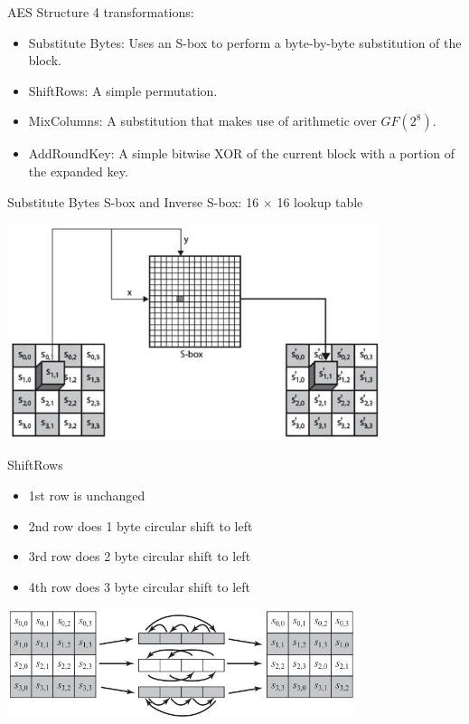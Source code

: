 \documentclass{beamer}
\begin{document}
\begin{frame}{AES Structure}
	4 transformations:
	\begin{itemize}
		\item Substitute Bytes:
		      Uses an S-box to perform a byte-by-byte substitution of the block.
		\item ShiftRows: A simple permutation.
		\item MixColumns: A substitution that makes use of arithmetic over $GF(2^8)$.
		\item AddRoundKey: A simple bitwise XOR of the current block with a portion of the expanded key.
	\end{itemize}
\end{frame}

\begin{frame}{Substitute Bytes}
	S-box and Inverse S-box: 16 $\times$ 16 lookup table

	\includegraphics[width=4.3in]{fig/clip_image006.jpg}
\end{frame}

\begin{frame}{ShiftRows}
	\begin{itemize}
		\item 1st row is unchanged

		\item 2nd row does 1 byte circular shift to left

		\item 3rd row does 2 byte circular shift to left

		\item 4th row does 3 byte circular shift to left
	\end{itemize}

	\includegraphics[width=4.0in]{fig/clip_image008.jpg}
\end{frame}
\end{document}

